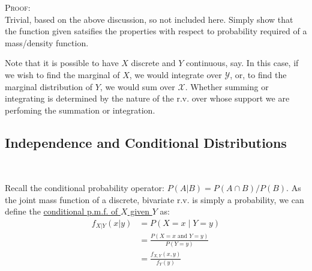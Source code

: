 \documentclass[12pt,a4paper]{article}
\begin{document}
\noindent\textsc{Proof:}\\
\indent Trivial, based on the above discussion, so not included here. Simply show that the function given satsifies the properties with respect to probability required of a mass/density function.

Note that it is possible to have $X$ discrete and $Y$ continuous, say. In this case, if we wish to find the marginal of $X$, we would integrate over $\mathcal{Y}$, or, to find the marginal distribution of $Y$, we would sum over $\mathcal{X}$. Whether summing or integrating is determined by the nature of the r.v. over whose support we are perfoming the summation or integration.

\subsection{Independence and Conditional Distributions}$\;$

Recall the conditional probability operator: $P(A|B) = P(A \cap B)/P(B)$. As the joint mass function of a dis\-crete, bi\-vari\-ate r.v. is sim\-ply a prob\-a\-bil\-ity, we can de\-fine the \underline{conditional p.m.f. of $X$ given $Y$} as:
\begin{align*}
f_{X|Y}(x|y) &= P(X = x\; | \; Y = y)\\
&= \frac{P(X = x \text{ and } Y = y)}{P(Y = y)}\\
&= \frac{f_{X,Y}(x,y)}{f_Y(y)}
\end{align*}
\end{document}
